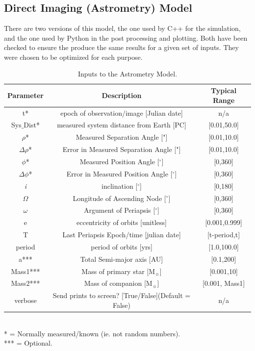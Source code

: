 \documentclass[10pt,preprint]{aastex}
\begin{document}
\subsection{Direct Imaging (Astrometry) Model}
There are two versions of this model, the one used by C++ for the simulation, and the one used by Python in the post processing and plotting.  Both have been checked to ensure the produce the same results for a given set of inputs.  They were chosen to be optimized for each purpose.
\begin{table}[h]
\centering
\caption{ Inputs to the Astrometry Model.}
\begin{tabular}{c c c}
\hline\hline
Parameter & Description & Typical Range \\
\hline
t* & epoch of observation/image [Julian date] & n/a\\
Sys$\_$Dist* & measured system distance from Earth [PC] &  [0.01,50.0]\\
$\rho$* & Measured Separation Angle ["] & [0.01,10.0]\\
$\Delta\rho$* & Error in Measured Separation Angle ["] & [0.01,10.0]\\
$\phi$*  & Measured Position Angle  [$^{\circ}$] & [0,360]\\
$\Delta\phi$*  & Error in Measured Position Angle  [$^{\circ}$] & [0,360]\\
{\it i} & inclination [$^{\circ}$] & [0,180]\\
$\Omega$ & Longitude of Ascending Node [$^{\circ}$] & [0,360]\\
$\omega$ & Argument of Periapsis [$^{\circ}$] & [0,360]\\
e & eccentricity of orbits [unitless] & [0.001,0.999]\\
T & Last Periapsis Epoch/time [julian date] & [t-period,t]\\
period & period of orbits [yrs] & [1.0,100.0]\\
a*** & Total Semi-major axis [AU]  & [0.1,200] \\
Mass1*** & Mass of primary star [M$_{\sun}$] & [0.001,10] \\
Mass2*** & Mass of companion [M$_{\sun}$] & [0.001, Mass1] \\
verbose & Send prints to screen? [True/False](Default = False) & n/a\\
\hline
\end{tabular}
\\
 * = Normally measured/known (ie. not random numbers).\\
 *** = Optional.
\end{table}
\end{document}
